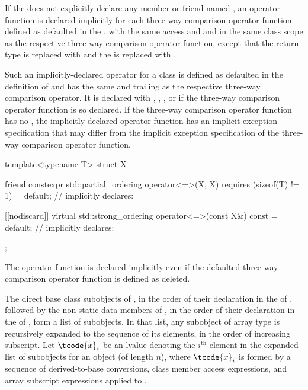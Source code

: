 \pnum
If the 
does not explicitly declare
any member or friend named ,
an \tcode{==} operator function is declared implicitly
for each three-way comparison operator function
defined as defaulted in the ,
with the same access and  and
in the same class scope as
the respective three-way comparison operator function,
except that the return type is replaced with  and
the  is replaced with .
\begin{note}
Such an implicitly-declared \tcode{==} operator for a class 
is defined as defaulted
in the definition of  and
has the same  and
trailing  as
the respective three-way comparison operator.
It is declared with , , ,
or  if
the three-way comparison operator function is so declared.
If the three-way comparison operator function
has no ,
the implicitly-declared \tcode{==} operator function
has an implicit exception specification that
may differ from the implicit exception specification of
the three-way comparison operator function.
\end{note}
\begin{example}
\begin{codeblock}
template<typename T> struct X {
  friend constexpr std::partial_ordering operator<=>(X, X) requires (sizeof(T) != 1) = default;
  // implicitly declares: 

  [[nodiscard]] virtual std::strong_ordering operator<=>(const X&) const = default;
  // implicitly declares: 
};
\end{codeblock}
\end{example}
\begin{note}
The \tcode{==} operator function is declared implicitly even if
the defaulted three-way comparison operator function
is defined as deleted.
\end{note}

\pnum
The direct base class subobjects of ,
in the order of their declaration in the  of ,
followed by the non-static data members of ,
in the order of their declaration in the  of ,
form a list of subobjects.
In that list, any subobject of array type is recursively expanded
to the sequence of its elements, in the order of increasing subscript.
Let $\tcode{x}_i$ be an lvalue denoting the $i^\text{th}$ element
in the expanded list of subobjects for an object 
(of length $n$),
where $\tcode{x}_i$ is
formed by a sequence of
derived-to-base conversions,
class member access expressions, and
array subscript expressions applied to .

